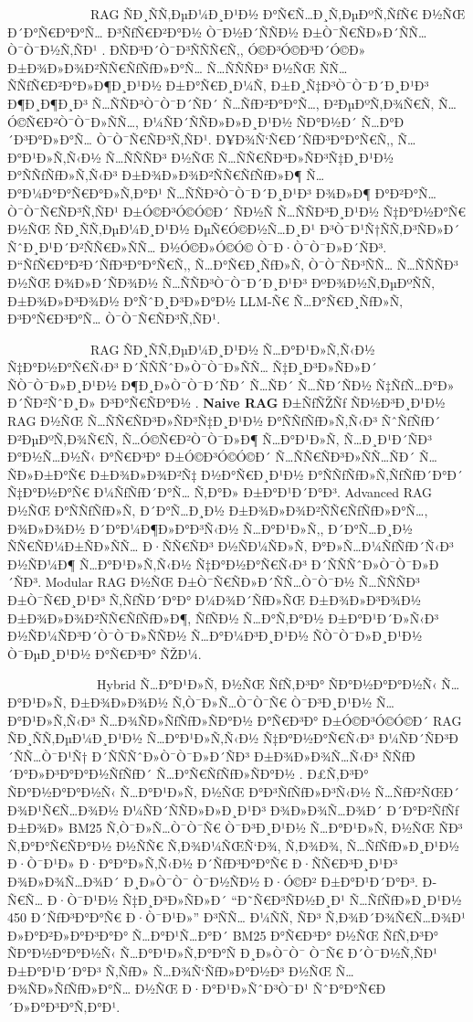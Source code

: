 \documentclass[12pt,A4]{report}
\begin{document}
\ \ \ \ \ \ \ \ \  \ \ \ \ RAG ÑÐ¸ÑÑ‚ÐµÐ¼Ð¸Ð¹Ð½ Ð°Ñ€Ñ…Ð¸Ñ‚ÐµÐºÑ‚ÑƒÑ€ Ð½ÑŒ Ð´Ð°Ñ€Ð°Ð°Ñ… Ð³ÑƒÑ€Ð²Ð°Ð½ Ò¯Ð½Ð´ÑÑÐ½
Ð±Ò¯Ñ€ÑÐ»Ð´ÑÑ…Ò¯Ò¯Ð½Ñ‚ÑÐ¹ \cite{gao2023retrieval}. ÐÑÐ³Ð´Ò¯Ð³ÑÑÑ€Ñ‚,
Ó©Ð³Ó©Ð³Ð´Ó©Ð» Ð±Ð¾Ð»Ð¾Ð²ÑÑ€ÑƒÑƒÐ»Ð°Ñ… Ñ…ÑÑÑÐ³ Ð½ÑŒ ÑÑ… ÑÑƒÑ€Ð²Ð°Ð»Ð¶Ð¸Ð¹Ð½ Ð±Ð°Ñ€Ð¸Ð¼Ñ‚ Ð±Ð¸Ñ‡Ð³Ò¯Ò¯Ð´Ð¸Ð¹Ð³
Ð¶Ð¸Ð¶Ð¸Ð³ Ñ…ÑÑÐ³Ò¯Ò¯Ð´ÑÐ´ Ñ…ÑƒÐ²Ð°Ð°Ñ…, Ð²ÐµÐºÑ‚Ð¾Ñ€Ñ‚ Ñ…Ó©Ñ€Ð²Ò¯Ò¯Ð»ÑÑ…, Ð¼ÑÐ´ÑÑÐ»Ð»Ð¸Ð¹Ð½ ÑÐ°Ð½Ð´ Ñ…Ð°Ð´Ð³Ð°Ð»Ð°Ñ…
Ò¯Ò¯Ñ€ÑÐ³Ñ‚ÑÐ¹. Ð¥Ð¾Ñ‘Ñ€Ð´ÑƒÐ³Ð°Ð°Ñ€Ñ‚, Ñ…Ð°Ð¹Ð»Ñ‚Ñ‹Ð½ Ñ…ÑÑÑÐ³ Ð½ÑŒ Ñ…ÑÑ€ÑÐ³Ð»ÑÐ³Ñ‡Ð¸Ð¹Ð½ Ð°ÑÑƒÑƒÐ»Ñ‚Ñ‹Ð³
Ð±Ð¾Ð»Ð¾Ð²ÑÑ€ÑƒÑƒÐ»Ð¶ Ñ…Ð°Ð¼Ð°Ð°Ñ€Ð°Ð»Ñ‚Ð°Ð¹ Ñ…ÑÑÐ³Ò¯Ò¯Ð´Ð¸Ð¹Ð³ Ð¾Ð»Ð¶ Ð°Ð²Ð°Ñ… Ò¯Ò¯Ñ€ÑÐ³Ñ‚ÑÐ¹ Ð±Ó©Ð³Ó©Ó©Ð´ ÑÐ½Ñ Ñ…ÑÑÐ³Ð¸Ð¹Ð½
Ñ‡Ð°Ð½Ð°Ñ€ Ð½ÑŒ ÑÐ¸ÑÑ‚ÐµÐ¼Ð¸Ð¹Ð½ ÐµÑ€Ó©Ð½Ñ…Ð¸Ð¹ Ð³Ò¯Ð¹Ñ†ÑÑ‚Ð³ÑÐ»Ð´ ÑˆÐ¸Ð¹Ð´Ð²ÑÑ€Ð»ÑÑ… Ð½Ó©Ð»Ó©Ó© Ò¯Ð·Ò¯Ò¯Ð»Ð´ÑÐ³.
Ð“ÑƒÑ€Ð°Ð²Ð´ÑƒÐ³Ð°Ð°Ñ€Ñ‚, Ñ…Ð°Ñ€Ð¸ÑƒÐ»Ñ‚ Ò¯Ò¯ÑÐ³ÑÑ… Ñ…ÑÑÑÐ³ Ð½ÑŒ Ð¾Ð»Ð´ÑÐ¾Ð½ Ñ…ÑÑÐ³Ò¯Ò¯Ð´Ð¸Ð¹Ð³
ÐºÐ¾Ð½Ñ‚ÐµÐºÑÑ‚ Ð±Ð¾Ð»Ð³Ð¾Ð½ Ð°ÑˆÐ¸Ð³Ð»Ð°Ð½ LLM-Ñ€ Ñ…Ð°Ñ€Ð¸ÑƒÐ»Ñ‚ Ð³Ð°Ñ€Ð³Ð°Ñ… Ò¯Ò¯Ñ€ÑÐ³Ñ‚ÑÐ¹.

\ \ \ \ \ \ \ \ \  \ \ \ \ RAG ÑÐ¸ÑÑ‚ÐµÐ¼Ð¸Ð¹Ð½ Ñ…Ð°Ð¹Ð»Ñ‚Ñ‹Ð½ Ñ‡Ð°Ð½Ð°Ñ€Ñ‹Ð³ Ð´ÑÑÑˆÐ»Ò¯Ò¯Ð»ÑÑ…
Ñ‡Ð¸Ð³Ð»ÑÐ»Ð´ ÑÒ¯Ò¯Ð»Ð¸Ð¹Ð½ Ð¶Ð¸Ð»Ò¯Ò¯Ð´ÑÐ´ Ñ…ÑÐ´ Ñ…ÑÐ´ÑÐ½ Ñ‡ÑƒÑ…Ð°Ð» Ð´ÑÐ²ÑˆÐ¸Ð» Ð³Ð°Ñ€ÑÐ°Ð½
\cite{chen2024benchmarking}. \textbf{Naive RAG} Ð±ÑƒÑŽÑƒ ÑÐ½Ð³Ð¸Ð¹Ð½ RAG Ð½ÑŒ
Ñ…ÑÑ€ÑÐ³Ð»ÑÐ³Ñ‡Ð¸Ð¹Ð½ Ð°ÑÑƒÑƒÐ»Ñ‚Ñ‹Ð³ ÑˆÑƒÑƒÐ´ Ð²ÐµÐºÑ‚Ð¾Ñ€Ñ‚ Ñ…Ó©Ñ€Ð²Ò¯Ò¯Ð»Ð¶ Ñ…Ð°Ð¹Ð»Ñ‚ Ñ…Ð¸Ð¹Ð´ÑÐ³ Ð°Ð½Ñ…Ð½Ñ‹
Ð°Ñ€Ð³Ð° Ð±Ó©Ð³Ó©Ó©Ð´ Ñ…ÑÑ€ÑÐ³Ð»ÑÑ…ÑÐ´ Ñ…ÑÐ»Ð±Ð°Ñ€ Ð±Ð¾Ð»Ð¾Ð²Ñ‡ Ð½Ð°Ñ€Ð¸Ð¹Ð½ Ð°ÑÑƒÑƒÐ»Ñ‚ÑƒÑƒÐ´Ð°Ð´ Ñ‡Ð°Ð½Ð°Ñ€ Ð¼ÑƒÑƒÐ´Ð°Ñ…
Ñ‚Ð°Ð» Ð±Ð°Ð¹Ð´Ð°Ð³. Advanced RAG Ð½ÑŒ Ð°ÑÑƒÑƒÐ»Ñ‚ Ð´Ð°Ñ…Ð¸Ð½ Ð±Ð¾Ð»Ð¾Ð²ÑÑ€ÑƒÑƒÐ»Ð°Ñ…, Ð¾Ð»Ð¾Ð½
Ð´Ð°Ð¼Ð¶Ð»Ð°Ð³Ñ‹Ð½ Ñ…Ð°Ð¹Ð»Ñ‚, Ð´Ð°Ñ…Ð¸Ð½ ÑÑ€ÑÐ¼Ð±ÑÐ»ÑÑ… Ð·ÑÑ€ÑÐ³ Ð½ÑÐ¼ÑÐ»Ñ‚ Ð°Ð»Ñ…Ð¼ÑƒÑƒÐ´Ñ‹Ð³ Ð½ÑÐ¼Ð¶ Ñ…Ð°Ð¹Ð»Ñ‚Ñ‹Ð½
Ñ‡Ð°Ð½Ð°Ñ€Ñ‹Ð³ Ð´ÑÑÑˆÐ»Ò¯Ò¯Ð»Ð´ÑÐ³. Modular RAG Ð½ÑŒ Ð±Ò¯Ñ€ÑÐ»Ð´ÑÑ…Ò¯Ò¯Ð½ Ñ…ÑÑÑÐ³ Ð±Ò¯Ñ€Ð¸Ð¹Ð³
Ñ‚ÑƒÑÐ´Ð°Ð° Ð¼Ð¾Ð´ÑƒÐ»ÑŒ Ð±Ð¾Ð»Ð³Ð¾Ð½ Ð±Ð¾Ð»Ð¾Ð²ÑÑ€ÑƒÑƒÐ»Ð¶, ÑƒÑÐ½ Ñ…Ð°Ñ‚Ð°Ð½ Ð±Ð°Ð¹Ð´Ð»Ñ‹Ð³ Ð½ÑÐ¼ÑÐ³Ð´Ò¯Ò¯Ð»ÑÑÐ½
Ñ…Ð°Ð¼Ð³Ð¸Ð¹Ð½ ÑÒ¯Ò¯Ð»Ð¸Ð¹Ð½ Ò¯ÐµÐ¸Ð¹Ð½ Ð°Ñ€Ð³Ð° ÑŽÐ¼.

\ \ \ \ \ \ \ \ \  \ \ \ \ \ Hybrid Ñ…Ð°Ð¹Ð»Ñ‚ Ð½ÑŒ ÑƒÑ‚Ð³Ð° ÑÐ°Ð½Ð°Ð°Ð½Ñ‹ Ñ…Ð°Ð¹Ð»Ñ‚
Ð±Ð¾Ð»Ð¾Ð½ Ñ‚Ò¯Ð»Ñ…Ò¯Ò¯Ñ€ Ò¯Ð³Ð¸Ð¹Ð½ Ñ…Ð°Ð¹Ð»Ñ‚Ñ‹Ð³ Ñ…Ð¾ÑÐ»ÑƒÑƒÐ»ÑÐ°Ð½ Ð°Ñ€Ð³Ð° Ð±Ó©Ð³Ó©Ó©Ð´ RAG ÑÐ¸ÑÑ‚ÐµÐ¼Ð¸Ð¹Ð½
Ñ…Ð°Ð¹Ð»Ñ‚Ñ‹Ð½ Ñ‡Ð°Ð½Ð°Ñ€Ñ‹Ð³ Ð¼ÑÐ´ÑÐ³Ð´ÑÑ…Ò¯Ð¹Ñ† Ð´ÑÑÑˆÐ»Ò¯Ò¯Ð»Ð´ÑÐ³ Ð±Ð¾Ð»Ð¾Ñ…Ñ‹Ð³ ÑÑƒÐ´Ð°Ð»Ð³Ð°Ð°Ð½ÑƒÑƒÐ´ Ñ…Ð°Ñ€ÑƒÑƒÐ»ÑÐ°Ð½
\cite{robertson2009bm25}. Ð£Ñ‚Ð³Ð° ÑÐ°Ð½Ð°Ð°Ð½Ñ‹ Ñ…Ð°Ð¹Ð»Ñ‚ Ð½ÑŒ Ð°Ð³ÑƒÑƒÐ»Ð³Ñ‹Ð½ Ñ…ÑƒÐ²ÑŒÐ´ Ð¾Ð¹Ñ€Ñ…Ð¾Ð½
Ð¼ÑÐ´ÑÑÐ»Ð»Ð¸Ð¹Ð³ Ð¾Ð»Ð¾Ñ…Ð¾Ð´ Ð´Ð°Ð²ÑƒÑƒ Ð±Ð¾Ð» BM25 Ñ‚Ò¯Ð»Ñ…Ò¯Ò¯Ñ€ Ò¯Ð³Ð¸Ð¹Ð½ Ñ…Ð°Ð¹Ð»Ñ‚ Ð½ÑŒ ÑÐ³ Ñ‚Ð°Ð°Ñ€ÑÐ°Ð½
Ð½ÑÑ€ Ñ‚Ð¾Ð¼ÑŒÑ‘Ð¾, Ñ‚Ð¾Ð¾, Ñ…ÑƒÑƒÐ»Ð¸Ð¹Ð½ Ð·Ò¯Ð¹Ð» Ð·Ð°Ð°Ð»Ñ‚Ñ‹Ð½ Ð´ÑƒÐ³Ð°Ð°Ñ€ Ð·ÑÑ€Ð³Ð¸Ð¹Ð³ Ð¾Ð»Ð¾Ñ…Ð¾Ð´ Ð¸Ð»Ò¯Ò¯ Ò¯Ð½ÑÐ½
Ð·Ó©Ð² Ð±Ð°Ð¹Ð´Ð°Ð³. Ð­Ñ€Ñ… Ð·Ò¯Ð¹Ð½ Ñ‡Ð¸Ð³Ð»ÑÐ»Ð´ ``Ð˜Ñ€Ð³ÑÐ½Ð¸Ð¹ Ñ…ÑƒÑƒÐ»Ð¸Ð¹Ð½ 450 Ð´ÑƒÐ³Ð°Ð°Ñ€ Ð·Ò¯Ð¹Ð»'' Ð³ÑÑ…
Ð¼ÑÑ‚ ÑÐ³ Ñ‚Ð¾Ð´Ð¾Ñ€Ñ…Ð¾Ð¹ Ð»Ð°Ð²Ð»Ð°Ð³Ð°Ð° Ñ…Ð°Ð¹Ñ…Ð°Ð´ BM25 Ð°Ñ€Ð³Ð° Ð½ÑŒ ÑƒÑ‚Ð³Ð° ÑÐ°Ð½Ð°Ð°Ð½Ñ‹ Ñ…Ð°Ð¹Ð»Ñ‚Ð°Ð°Ñ
Ð¸Ð»Ò¯Ò¯ Ò¯Ñ€ Ð´Ò¯Ð½Ñ‚ÑÐ¹ Ð±Ð°Ð¹Ð´Ð°Ð³ Ñ‚ÑƒÐ» Ñ…Ð¾Ñ‘ÑƒÐ»Ð°Ð½Ð³ Ð½ÑŒ Ñ…Ð¾ÑÐ»ÑƒÑƒÐ»Ð°Ñ… Ð½ÑŒ Ð·Ð°Ð¹Ð»ÑˆÐ³Ò¯Ð¹
ÑˆÐ°Ð°Ñ€Ð´Ð»Ð°Ð³Ð°Ñ‚Ð°Ð¹.
\end{document}

